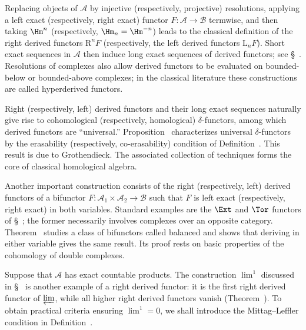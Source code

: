 Replacing objects of $\mathcal{A}$ by injective (respectively, projective)
resolutions, applying a left exact (respectively, right exact) functor
$F:\mathcal{A}\to\mathcal{B}$ termwise, and then taking $\Hm^n$
(respectively, $\Hm_n=\Hm^{-n}$) leads to the classical definition of the
right derived functors $\mathrm{R}^nF$ (respectively, the left derived
functors $\mathrm{L}_nF$). Short exact sequences in $\mathcal{A}$ then induce
long exact sequences of derived functors; see
\S~. Resolutions of complexes also
allow derived functors to be evaluated on bounded-below or bounded-above
complexes; in the classical literature these constructions are called
hyperderived functors.

Right (respectively, left) derived functors and their long exact sequences
naturally give rise to cohomological (respectively, homological)
$\delta$-functors, among which derived functors are ``universal.''
Proposition~
characterizes universal $\delta$-functors by the erasability (respectively,
co-erasability) condition of Definition~. This result is due to Grothendieck. The associated collection of
techniques forms the core of classical homological algebra.

Another important construction consists of the right (respectively, left)
derived functors of a bifunctor
$F:\mathcal{A}_1\times\mathcal{A}_2\to\mathcal{B}$ such that $F$ is left
exact (respectively, right exact) in both variables. Standard examples are the
$\Ext$ and $\Tor$ functors of \S~; the
former necessarily involves complexes over an opposite category.
Theorem~ studies a class of
bifunctors called balanced and shows that deriving in either variable gives
the same result. Its proof rests on basic properties of the cohomology of
double complexes.

Suppose that $\mathcal{A}$ has exact countable products. The construction
$\lim^1$ discussed in \S~ is another example
of a right derived functor: it is the first right derived functor of
$\varprojlim$, while all higher right derived functors vanish
(Theorem~). To obtain practical
criteria ensuring $\lim^1=0$, we shall introduce the Mittag--Leffler
condition in Definition~.

